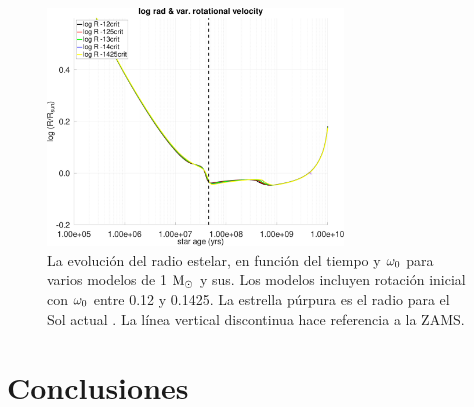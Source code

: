 \begin{figure}
	\centering
	\includegraphics[width=0.7\textwidth]{img/paper2/lograd_var_vel_g3.pdf}
	\caption{La evolución del radio estelar, en función del tiempo y $\omega_{\mathrm{0}}$ para varios modelos de 1 $\mathrm{M}_\odot$ y sus. Los modelos incluyen rotación inicial con $\omega_{\mathrm{0}}$ entre 0.12 y 0.1425. La estrella púrpura es el radio para el Sol actual \cite{Gill2012}. La línea vertical discontinua hace referencia a la ZAMS.}
	\label{fig:lograd_var_vel_g3}
\end{figure}




\section{Conclusiones}

\endinput

